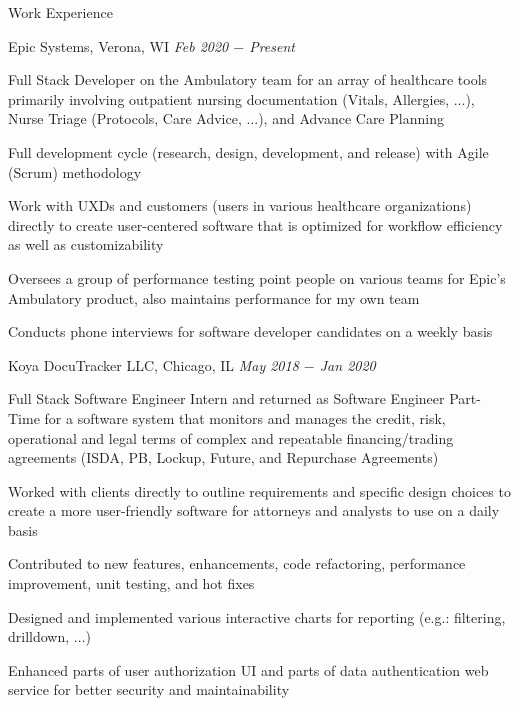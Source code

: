\documentclass{resume}
\begin{document}
\begin{rSection}{Work Experience}

\begin{rSubsection}{Epic Systems, Verona, WI} {\textit{Feb 2020 $-$ Present}}
{}

    \item Full Stack Developer on the Ambulatory team for an array of healthcare tools primarily involving outpatient nursing documentation (Vitals, Allergies, ...), Nurse Triage (Protocols, Care Advice, ...), and Advance Care Planning
    \item Full development cycle (research, design, development, and release) with Agile (Scrum) methodology
    \item Work with UXDs and customers (users in various healthcare organizations) directly to create user-centered software that is optimized for workflow efficiency as well as customizability
    \item Oversees a group of performance testing point people on various teams for Epic's Ambulatory product, also maintains performance for my own team
    \item Conducts phone interviews for software developer candidates on a weekly basis

\end{rSubsection}

\begin{rSubsection}{Koya DocuTracker LLC, Chicago, IL} {\textit{May 2018 $-$ Jan 2020}}
{}

    \item Full Stack Software Engineer Intern and returned as Software Engineer Part-Time for a software system that monitors and manages the credit, risk, operational and legal terms of complex and repeatable financing/trading agreements (ISDA, PB, Lockup, Future, and Repurchase Agreements)
    \item Worked with clients directly to outline requirements and specific design choices to create a more user-friendly software for attorneys and analysts to use on a daily basis
    \item Contributed to new features, enhancements, code refactoring, performance improvement, unit testing, and hot fixes
    \item Designed and implemented various interactive charts for reporting (e.g.: filtering, drilldown, ...)
    \item Enhanced parts of user authorization UI and parts of data authentication web service for better security and maintainability

\end{rSubsection}

\end{rSection}
\end{document}
